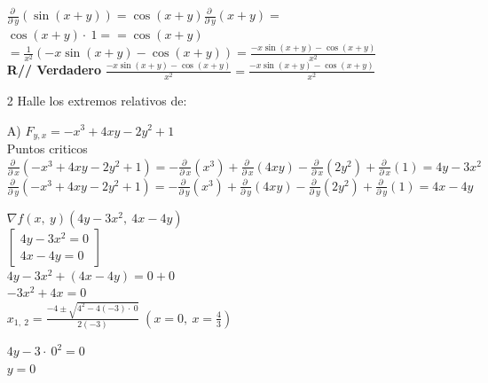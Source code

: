 \documentclass[13pt]{memoir}
\begin{document}
\begin{enumerate}
$\frac{\partial \:}{\partial \:y}\left(\sin \left(x+y\right)\right) =\cos \left(x+y\right)\frac{\partial \:}{\partial \:y}\left(x+y\right) =$\\
$\cos \left(x+y\right)\cdot \:1 = =\cos \left(x+y\right)$\\

$=\frac{1}{x^2}\left(-x\sin \left(x+y\right)-\cos \left(x+y\right)\right) = \frac{-x\sin \left(x+y\right)-\cos \left(x+y\right)}{x^2}$\\


\textbf{ R// Verdadero} $\frac{-x\sin \left(x+y\right)-\cos \left(x+y\right)}{x^2} =  \frac{-x\sin \left(x+y\right)-\cos \left(x+y\right)}{x^2}$\\

\item[ 2] Halle los extremos relativos de:\\

\item[ A)] $F_{y,x}= -x^3 + 4xy - 2y^2+1$\\

{\tiny Puntos criticos}\\
$\frac{\partial \:}{\partial \:x}\left(-x^3+4xy-2y^2+1\right) =-\frac{\partial \:}{\partial \:x}\left(x^3\right)+\frac{\partial \:}{\partial \:x}\left(4xy\right)-\frac{\partial \:}{\partial \:x}\left(2y^2\right)+\frac{\partial \:}{\partial \:x}\left(1\right) =4y-3x^2$ \\
$\frac{\partial \:}{\partial \:y}\left(-x^3+4xy-2y^2+1\right) =-\frac{\partial \:}{\partial \:y}\left(x^3\right)+\frac{\partial \:}{\partial \:y}\left(4xy\right)-\frac{\partial \:}{\partial \:y}\left(2y^2\right)+\frac{\partial \:}{\partial \:y}\left(1\right) = 4x-4y$

$\nabla f\left(x,\:y\right)\left(4y-3x^2,\:4x-4y\right)$\\

$\begin{bmatrix}4y-3x^2=0\\ 4x-4y=0\end{bmatrix}$\\

$4y-3x^2+\left(4x-4y\right)=0+0$\\
$-3x^2+4x=0$\\
$x_{1,\:2}=\frac{-4\pm \sqrt{4^2-4\left(-3\right)\cdot \:0}}{2\left(-3\right)} \; (x=0,\:x=\frac{4}{3})$\\

\noindent
\begin{minipage}[t]{0.5\textwidth}
$4y-3\cdot \:0^2=0$\\
$y=0$\\


\end{minipage}
\end{enumerate}
\end{document}
